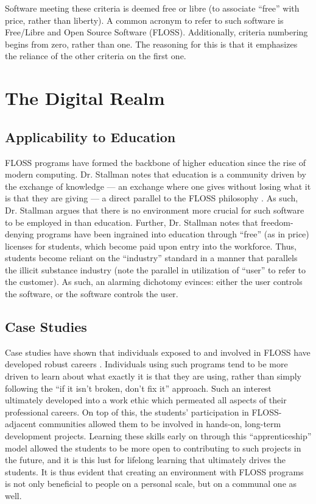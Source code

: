 \documentclass[conference]{IEEEtran}
\begin{document}
Software meeting these criteria is deemed free or libre (to associate ``free'' with price, rather than liberty). A common acronym to refer to such software is Free/Libre and Open Source Software (FLOSS). Additionally, criteria numbering begins from zero, rather than one. The reasoning for this is that it emphasizes the reliance of the other criteria on the first one.

\section{The Digital Realm}

\subsection{Applicability to Education}

FLOSS programs have formed the backbone of higher education since the rise of modern computing. Dr. Stallman notes that education is a community driven by the exchange of knowledge — an exchange where one gives without losing what it is that they are giving —  a direct parallel to the FLOSS philosophy \cite{Stallman}. As such, Dr. Stallman argues that there is no environment more crucial for such software to be employed in than education. Further, Dr. Stallman notes that freedom-denying programs have been ingrained into education through ``free'' (as in price) licenses for students, which become paid upon entry into the workforce. Thus, students become reliant on the ``industry'' standard in a manner that parallels the illicit substance industry (note the parallel in utilization of ``user'' to refer to the customer). As such, an alarming dichotomy evinces: either the user controls the software, or the software controls the user.

\subsection{Case Studies}

Case studies have shown that individuals exposed to and involved in FLOSS have developed robust careers \cite{LifelongLearning}. Individuals using such programs tend to be more driven to learn about what exactly it is that they are using, rather than simply following the ``if it isn't broken, don't fix it'' approach. Such an interest ultimately developed into a work ethic which permeated all aspects of their professional careers. On top of this, the students' participation in FLOSS-adjacent communities allowed them to be involved in hands-on, long-term development projects. Learning these skills early on through this ``apprenticeship'' model allowed the students to be more open to contributing to such projects in the future, and it is this lust for lifelong learning that ultimately drives the students. It is thus evident that creating an environment with FLOSS programs is not only beneficial to people on a personal scale, but on a communal one as well.
\end{document}
